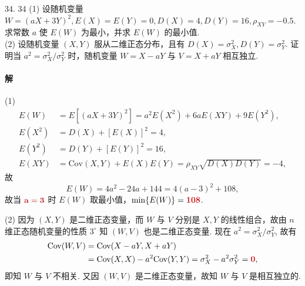 \documentclass[11pt, UTF8]{ctexart}
\newcommand{\ans}[1]{\mathbf{\color{fred}#1}}
\begin{document}
\vspace{1.5em}

\begin{problem}{3}{4. 34}
(1) 设随机变量 $W = (aX+3Y)^2, E(X) = E(Y) = 0, D(X) = 4, D(Y) = 16, \rho_{XY} = -0.5$. 求常数 $a$ 使 $E(W)$ 为最小，并求 $E(W)$ 的最小值. \\
(2) 设随机变量 $(X,Y)$ 服从二维正态分布，且有 $D(X) = \sigma_X^2, D(Y) = \sigma_Y^2$. 证明当 $a^2 = \sigma_X^2/\sigma_Y^2$ 时，随机变量 $W = X-aY$ 与 $V = X+aY$ 相互独立.
\end{problem}

\paragraph{\color{fblue}解}
(1) 
\begin{align*} 
E(W) &= E[(aX+3Y)^2] = a^2E(X^2) + 6aE(XY) + 9E(Y^2), \\
E(X^2) &= D(X) + [E(X)]^2 = 4, \\
E(Y^2) &= D(Y) + [E(Y)]^2 = 16, \\
E(XY) &= \text{Cov}(X,Y) + E(X)E(Y) = \rho_{XY}\sqrt{D(X)D(Y)} = -4, 
\end{align*}
故
\[ E(W) = 4a^2 - 24a + 144 = 4(a-3)^2 + 108, \]
故当 $\ans{a = 3}$ 时 $E(W)$ 取最小值，$\min\{E(W)\} = \ans{108}$.

(2) 因为 $(X,Y)$ 是二维正态变量，而 $W$ 与 $V$ 分别是 $X,Y$ 的线性组合，故由 $n$ 维正态随机变量的性质 $3^{\circ}$ 知 $(W,V)$ 也是二维正态变量. 现在 $a^2 = \sigma_X^2/\sigma_Y^2$, 故有
\begin{align*}
\text{Cov}(W,V) &= \text{Cov}(X-aY, X+aY) \\
&= \text{Cov}(X,X) - a^2\text{Cov}(Y,Y) = \sigma_X^2 - a^2\sigma_Y^2 = \ans{0},
\end{align*}
即知 $W$ 与 $V$ 不相关. 又因 $(W,V)$ 是二维正态变量，故知 $W$ 与 $V$ 是相互独立的.
\end{document}
